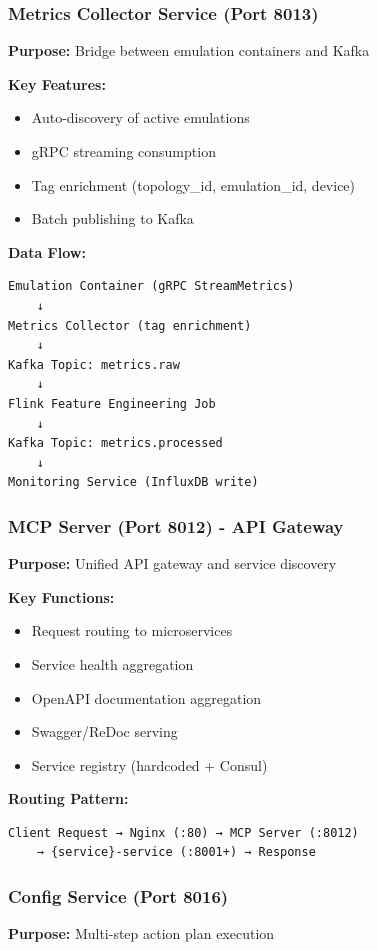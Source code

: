 \documentclass[10pt,a4paper]{article}
\begin{document}
\subsubsection{Metrics Collector Service (Port 8013)}
\textbf{Purpose:} Bridge between emulation containers and Kafka

\textbf{Key Features:}
\begin{itemize}
\item Auto-discovery of active emulations
\item gRPC streaming consumption
\item Tag enrichment (topology\_id, emulation\_id, device)
\item Batch publishing to Kafka
\end{itemize}

\textbf{Data Flow:}
\begin{verbatim}
Emulation Container (gRPC StreamMetrics)
    ↓
Metrics Collector (tag enrichment)
    ↓
Kafka Topic: metrics.raw
    ↓
Flink Feature Engineering Job
    ↓
Kafka Topic: metrics.processed
    ↓
Monitoring Service (InfluxDB write)
\end{verbatim}

\subsubsection{MCP Server (Port 8012) - API Gateway}
\textbf{Purpose:} Unified API gateway and service discovery

\textbf{Key Functions:}
\begin{itemize}
\item Request routing to microservices
\item Service health aggregation
\item OpenAPI documentation aggregation
\item Swagger/ReDoc serving
\item Service registry (hardcoded + Consul)
\end{itemize}

\textbf{Routing Pattern:}
\begin{verbatim}
Client Request → Nginx (:80) → MCP Server (:8012)
    → {service}-service (:8001+) → Response
\end{verbatim}

\subsubsection{Config Service (Port 8016)}
\textbf{Purpose:} Multi-step action plan execution
\end{document}
